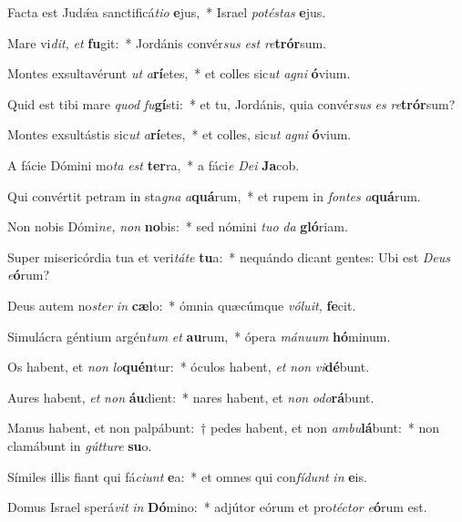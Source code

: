 \item Facta est Judǽa sanctificá\textit{tio} \textbf{e}jus,~* Israel \textit{potéstas} \textbf{e}jus.
\item Mare vi\textit{dit,} \textit{et} \textbf{fu}git:~* Jordánis convér\textit{sus} \textit{est} \textit{re}\textbf{trór}sum.
\item Montes exsultavérunt \textit{ut} \textit{a}\textbf{rí}etes,~* et colles sic\textit{ut} \textit{agni} \textbf{ó}vium.
\item Quid est tibi mare \textit{quod} \textit{fu}\textbf{gí}sti:~* et tu, Jordánis, quia convér\textit{sus} \textit{es} \textit{re}\textbf{trór}sum?
\item Montes exsultástis sic\textit{ut} \textit{a}\textbf{rí}etes,~* et colles, sic\textit{ut} \textit{agni} \textbf{ó}vium.
\item A fácie Dómini mo\textit{ta} \textit{est} \textbf{ter}ra,~* a fáci\textit{e} \textit{Dei} \textbf{Ja}cob.
\item Qui convértit petram in sta\textit{gna} \textit{a}\textbf{quá}rum,~* et rupem in \textit{fontes} \textit{a}\textbf{quá}rum.
\item Non nobis Dómi\textit{ne,} \textit{non} \textbf{no}bis:~* sed nómini \textit{tuo} \textit{da} \textbf{gló}riam.
\item Super misericórdia tua et veri\textit{táte} \textbf{tu}a:~* nequándo dicant gentes: Ubi est \textit{Deus} \textit{e}\textbf{ó}rum?
\item Deus autem no\textit{ster} \textit{in} \textbf{cæ}lo:~* ómnia quæcúmque \textit{vóluit,} \textbf{fe}cit.
\item Simulácra géntium argén\textit{tum} \textit{et} \textbf{au}rum,~* ópera \textit{mánuum} \textbf{hó}minum.
\item Os habent, et \textit{non} \textit{lo}\textbf{quén}tur:~* óculos habent, \textit{et} \textit{non} \textit{vi}\textbf{dé}bunt.
\item Aures habent, \textit{et} \textit{non} \textbf{áu}dient:~* nares habent, et \textit{non} \textit{odo}\textbf{rá}bunt.
\item Manus habent, et non palpábunt:~† pedes habent, et non \textit{ambu}\textbf{lá}bunt:~* non clamábunt in \textit{gútture} \textbf{su}o.
\item Símiles illis fiant qui fá\textit{ciunt} \textbf{e}a:~* et omnes qui con\textit{fídunt} \textit{in} \textbf{e}is.
\item Domus Israel sperá\textit{vit} \textit{in} \textbf{Dó}mino:~* adjútor eórum et pro\textit{téctor} \textit{e}\textbf{ó}rum est.

